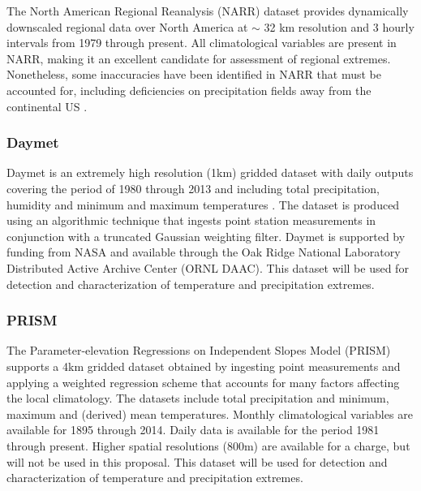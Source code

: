 \documentclass[11pt]{article}
\begin{document}
The North American Regional Reanalysis (NARR) dataset \citep{mesinger2006north} provides dynamically downscaled regional data over North America at $\sim$ 32 km resolution and 3 hourly intervals from 1979 through present.  All climatological variables are present in NARR, making it an excellent candidate for assessment of regional extremes.  Nonetheless, some inaccuracies have been identified in NARR that must be accounted for, including deficiencies on precipitation fields away from the continental US \citep{bukovsky2007brief}.

\subsubsection{Daymet} \label{sec:DAYMET}

Daymet is an extremely high resolution (1km) gridded dataset with daily outputs covering the period of 1980 through 2013 and including total precipitation, humidity and minimum and maximum temperatures \citep{thornton1997generating, thornton1999improved, thornton2000simultaneous}.  The dataset is produced using an algorithmic technique that ingests point station measurements in conjunction with a truncated Gaussian weighting filter.  Daymet is supported by funding from NASA and available through the Oak Ridge National Laboratory Distributed Active Archive Center (ORNL DAAC).  This dataset will be used for detection and characterization of temperature and precipitation extremes.

\subsubsection{PRISM} \label{sec:PRISM}

The Parameter-elevation Regressions on Independent Slopes Model (PRISM) \citep{daly2008physiographically} supports a 4km gridded dataset obtained by ingesting point measurements and applying a weighted regression scheme that accounts for many factors affecting the local climatology.  The datasets include total precipitation and minimum, maximum and (derived) mean temperatures.  Monthly climatological variables are available for 1895 through 2014.  Daily data is available for the period 1981 through present.  Higher spatial resolutions (800m) are available for a charge, but will not be used in this proposal.  This dataset will be used for detection and characterization of temperature and precipitation extremes.

\end{document}

